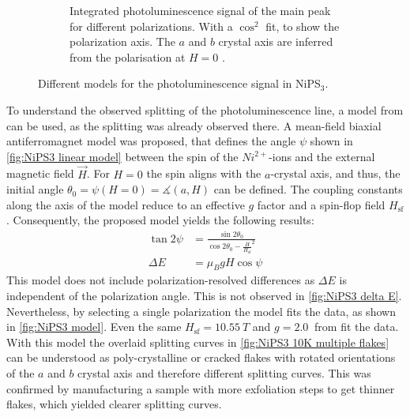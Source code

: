 \documentclass[
	twoside,
	parskip=half,
	a4paper,
]{scrbook}
\begin{document}
\begin{figure}
\begin{subfigure}[t]{3in}
		\caption{
			Integrated photoluminescence signal of the main peak for different polarizations. 
			With a $\cos^2$ fit, to show the polarization axis. 
			The $a$ and $b$ crystal axis are inferred from the polarisation at $H=0$ \cite{NiPS3_linear}.
		}
		\label{fig:NiPS3 polarisation peanut}
	\end{subfigure}
	\caption{Different models for the photoluminescence signal in NiPS$_3$.}
\end{figure}
To understand the observed splitting of the photoluminescence line, a model from \cite{NiPS3_magnon_gap} can be used, as the splitting was already observed there. 
A mean-field biaxial antiferromagnet model was proposed, that defines the angle $\psi$ shown in \autoref{fig:NiPS3 linear model} between the spin of the $Ni^{2+}$-ions and the external magnetic field $\vec{H}$.
For $H=0$ the spin aligns with the $a$-crystal axis, and thus, the initial angle $\theta_0=\psi\left(H=0\right)=\measuredangle(a, H)$ can be defined.
The coupling constants along the axis of the model reduce to an effective $g$ factor and a spin-flop field $H_\text{sf}$.
Consequently, the proposed model \autocite{NiPS3_magnon_gap} yields the following results:
\begin{align}
	\tan 2\psi &= \frac{\sin 2\theta_0}{\cos 2\theta_0 - \frac{H}{H_\text{sf}}^2}\\
	\Delta E &= \mu_B g H \cos \psi
	\label{eq:NiPS3 model}
\end{align}
This model does not include polarization-resolved differences as $\Delta E$ is independent of the polarization angle.
This is not observed in \autoref{fig:NiPS3 delta E}.
Nevertheless, by selecting a single polarization the model fits the data, as shown in \autoref{fig:NiPS3 model}.
Even the same $H_\text{sf} = \SI{10.55}{T}$ and $g=\SI{2.0}{}$ from \autocite{NiPS3_magnon_gap} fit the data.\\
With this model the overlaid splitting curves in \autoref{fig:NiPS3 10K multiple flakes} can be understood as poly-crystalline or cracked flakes with rotated orientations of the $a$ and $b$ crystal axis and therefore different splitting curves.
This was confirmed by manufacturing a sample with more exfoliation steps to get thinner flakes, which yielded clearer splitting curves.
\end{document}
